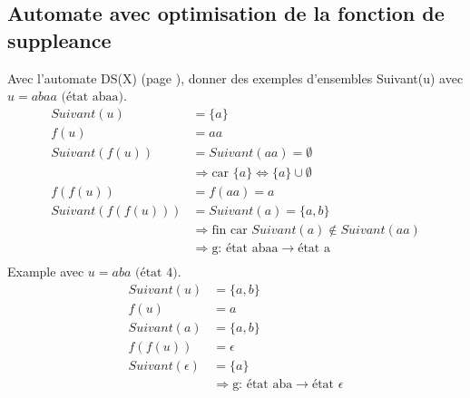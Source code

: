 \documentclass[11pt,a4paper]{article}
\begin{document}
	\subsection{Automate avec optimisation de la fonction de suppleance}
	
	Avec l'automate DS(X) (page \pageref{DS(X)}), donner des exemples d'ensembles Suivant(u) avec $u = abaa \text{ (état abaa)}$.\\
	\begin{align*}
		Suivant(u) &= \{a\}\\
		f(u) &= aa\\
		Suivant(f(u)) &= Suivant(aa) = \emptyset\\
		&\Rightarrow \text{car } \{a\} \Leftrightarrow \{a\} \cup \emptyset \\
		f(f(u)) &= f(aa) = a\\
		Suivant(f(f(u))) &= Suivant(a) = \{a, b\}\\
		&\Rightarrow \text{fin car } Suivant(a) \notin Suivant(aa)\\
		&\Rightarrow \text{g: état abaa} \rightarrow \text{état a}\\
	\end{align*}
	Example avec $u = aba \text{ (état 4)}$.\\
	\begin{align*}
		Suivant(u) &= \{a, b\}\\
		f(u) &= a\\
		Suivant(a) &= \{a, b\}\\
		f(f(u)) &= \epsilon\\
		Suivant(\epsilon) &= \{a\}\\
		&\Rightarrow \text{g: état aba} \rightarrow \text{état }\epsilon\\
	\end{align*}
\end{document}
